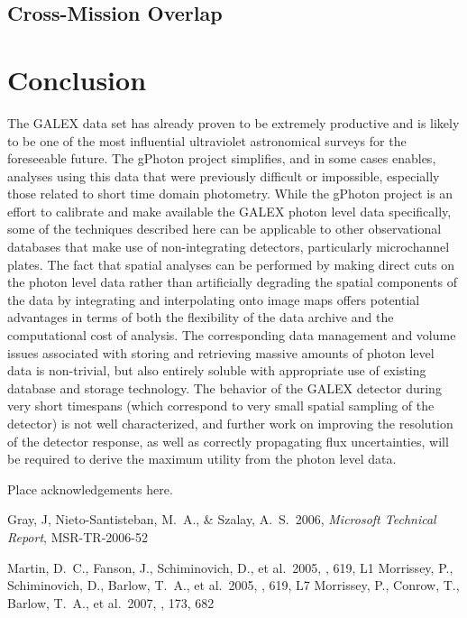 \documentclass[preprint]{aastex}
\begin{document}
\subsection{Cross-Mission Overlap}

\section{Conclusion}
The GALEX data set has already proven to be extremely productive and is likely to be one of the most influential ultraviolet astronomical surveys for the foreseeable future. The gPhoton project simplifies, and in some cases enables, analyses using this data that were previously difficult or impossible, especially those related to short time domain photometry. While the gPhoton project is an effort to calibrate and make available the GALEX photon level data specifically, some of the techniques described here can be applicable to other observational databases that make use of non-integrating detectors, particularly microchannel plates. The fact that spatial analyses can be performed by making direct cuts on the photon level data rather than artificially degrading the spatial components of the data by integrating and interpolating onto image maps offers potential advantages in terms of both the flexibility of the data archive and the computational cost of analysis. The corresponding data management and volume issues associated with storing and retrieving massive amounts of photon level data is non-trivial, but also entirely soluble with appropriate use of existing database and storage technology. The behavior of the GALEX detector during very short timespans (which correspond to very small spatial sampling of the detector) is not well characterized, and further work on improving the resolution of the detector response, as well as correctly propagating flux uncertainties, will be required to derive the maximum utility from the photon level data.

\acknowledgements
Place acknowledgements here.

\begin{thebibliography}{}
 Gray, J, Nieto-Santisteban, M.~A., \& Szalay, A.~S.\ 2006, \emph{Microsoft Technical Report}, MSR-TR-2006-52

 Martin, D.~C., Fanson, J., Schiminovich, D., et al.\ 2005, \apjl, 619, L1
 Morrissey, P., Schiminovich, D., Barlow, T.~A., et al.\ 2005, \apjl, 619, L7
 Morrissey, P., Conrow, T., Barlow, T.~A., et al.\ 2007, \apjs, 173, 682
\end{thebibliography}
\end{document}
